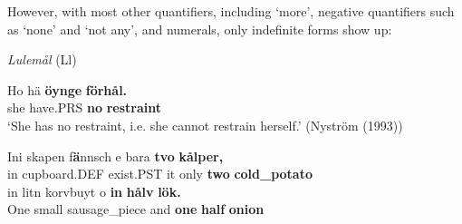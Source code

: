 
However, with most other quantifiers, including  ‘more’, negative quantifiers such as  ‘none’ and  ‘not any’, and numerals, only indefinite forms show up:


\item 

\textit{Lulemål} (Ll) 



\item 


 \ea\label{}
\gll Ho  hä  \textbf{öynge} \textbf{förhål.}\\


she  have.PRS  \textbf{no} \textbf{restraint}\\

\glt ‘She has no restraint, i.e. she cannot restrain herself.’ (Nyström (1993))

\z

\item 


 \ea\label{}
\gll Ini  skapen  f\textbf{ä}nnsch  e  bara  \textbf{tvo}\textbf{  kålper,}\\


in  cupboard.DEF  exist.PST  it  only  \textbf{two} \textbf{cold\_potato}\\

 \ea\label{}
\gll in  litn  korvbuyt  o  \textbf{in}\textbf{  hå}\textbf{l}\textbf{v}\textbf{  lök.}\\


One  small  sausage\_piece  and  \textbf{one} \textbf{half} \textbf{onion}\\

